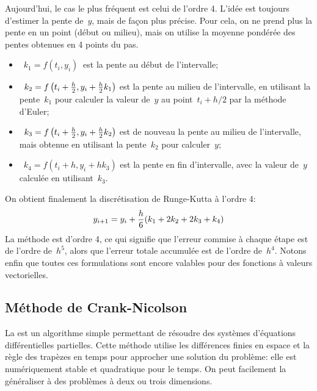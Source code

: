 Aujourd'hui, le cas le plus fréquent est celui de l'ordre 4. L'idée est toujours d'estimer la pente de~$y$, mais de façon plus précise. Pour cela, on ne prend plus la pente en un point (début ou milieu), mais on utilise la moyenne pondérée des pentes obtenues en 4 points du pas. 
\begin{itemize} 
\item~$k_1 = f \left( t_i, y_i \right)~$ est la pente au début de l'intervalle; 
\item~$k_2 = f \left( t_i + {h \over 2}, y_i + {h\over 2} k_1 \right)$ est la pente au milieu de l'intervalle, en utilisant la pente~$k_1$ pour calculer la valeur de~$y$ au point~$t_i + h/2$ par la méthode d'Euler; 
\item~$k_3 = f \left( t_i + {h \over 2}, y_i + {h\over 2} k_2 \right)$ est de nouveau la pente au milieu de l'intervalle, mais obtenue en utilisant la pente~$k_2$ pour calculer~$y$; 
\item~$k_4 = f \left( t_i + h, y_i + h k_3\right)$ est la pente en fin d'intervalle, avec la valeur de~$y$ calculée en utilisant~$k_3$. 
\end{itemize} 
 On obtient finalement la discrétisation de Runge-Kutta à l'ordre 4:
\begin{equation}
y_{i+1} = y_i + {h \over 6} (k_1 + 2k_2 + 2k_3 + k_4)
\end{equation}
La méthode est d'ordre 4, ce qui signifie que l'erreur commise à chaque étape est de l'ordre de~$h^5$, alors que l'erreur totale accumulée est de l'ordre de~$h^4$. Notons enfin que toutes ces formulations sont encore valables pour des fonctions à valeurs vectorielles. 

\medskip
\subsection{Méthode de Crank-Nicolson}

La  est un algorithme simple permettant de résoudre des systèmes d'équations différentielles partielles. 
Cette méthode utilise les différences finies en espace et la règle des trapèzes en temps pour approcher une solution du problème: 
elle est numériquement stable et quadratique pour le temps. 
On peut facilement la généraliser à des problèmes à deux ou trois dimensions.

